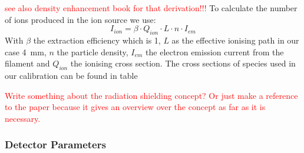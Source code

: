 		
		
		\textcolor{red}{see also density enhancement book for that derivation!!!}
		To calculate the number of ions produced in the ion source we use:
		\begin{equation}
		I_{ion} = \beta\cdot Q_{ion}\cdot L\cdot n\cdot I_{em}
		\end{equation}
		With $\beta$ the extraction efficiency which is 1, %
		$L$ as the effective ionising path in our case 4~\si{\milli\metre}, $n$ the particle density, $I_{em}$ the electron emission current from the filament and $Q_{ion}$ the ionising cross section. The cross sections of species used in our calibration can be found in table %
		
		\textcolor{red}{Write something about the radiation shielding concept? Or just make a reference to the paper because it gives an overview over the concept as far as it is necessary.}
		
		\subsubsection{Detector Parameters} %
		

